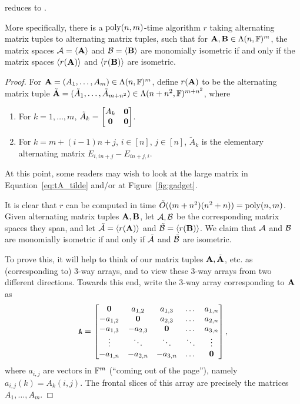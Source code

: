 \documentclass[11pt]{article}
\begin{document}
\begin{lemma} \label{lem:gadget}
\AltMatSpMonIsomlong reduces to \AltMatSpIsomWords. 

More specifically, there is a $\mathrm{poly}(n,m)$-time algorithm $r$ taking alternating matrix tuples to alternating matrix tuples, such that for $\mathbf{A}, \mathbf{B} \in \Lambda(n,\mathbb{F})^m$, the matrix spaces $\mathcal{A} = \langle \mathbf{A} \rangle$ and $\mathcal{B} = \langle \mathbf{B} \rangle$ are monomially isometric if and only if the matrix spaces $\langle r(\mathbf{A}) \rangle$ and $\langle r(\mathbf{B}) \rangle$ are isometric.
\end{lemma}

\begin{proof}
For $\mathbf{A} = (A_1, \dotsc, A_m) \in \Lambda(n,\mathbb{F})^m$, define $r(\mathbf{A})$ to be the alternating matrix tuple 
$\tilde{\mathbf{A}}=(\tilde A_1, \dots, \tilde A_{m+n^2})\in \Lambda(n + n^2, \mathbb{F})^{m+n^2}$, 
where
\begin{enumerate}
\item For $k=1, \dots, m$, $\tilde A_k=\begin{bmatrix}
A_k & \mathbf{0} \\
\mathbf{0} & \mathbf{0} \\
\end{bmatrix}$.
\item For $k=m+(i-1)n+j$, $i\in[n]$, $j\in[n]$, $\tilde A_k$ is the elementary 
alternating matrix $E_{i,in+j} - E_{in+j,i}$.
\end{enumerate}
At this point, some readers may wish to look at the large 
matrix in Equation~\ref{eq:tA_tilde} 
and/or at Figure~\ref{fig:gadget}.

It is clear that $r$ can be computed in time $\tilde O((m+n^2)(n^2 + n)) = \mathrm{poly}(n,m)$. Given alternating matrix tuples $\mathbf{A}, \mathbf{B}$, let $\mathcal{A},\mathcal{B}$ be the corresponding matrix spaces they span, and let $\tilde{\mathcal{A}} = \langle r(\mathbf{A}) \rangle$ and $\tilde{\mathcal{B}} = \langle r(\mathbf{B}) \rangle$. We claim that $\mathcal{A}$ and $\mathcal{B}$ are monomially isometric if and only if $\tilde{\mathcal{A}}$ and $\tilde{\mathcal{B}}$ are isometric.

To prove this, it will help to think of our matrix tuples $\mathbf{A}, \tilde {\mathbf{A}}$, etc. as (corresponding to) 3-way arrays, and to view these 3-way arrays from two different directions. Towards this end, write the 3-way array corresponding to $\mathbf{A}$ as
$$
\mathtt{A}=\begin{bmatrix}
\mathbf{0} & a_{1,2} & a_{1,3} & \dots & a_{1,n} \\
-a_{1,2} & \mathbf{0} & a_{2,3} & \dots & a_{2,n} \\
-a_{1,3} & -a_{2,3} & \mathbf{0} & \dots & a_{3,n}\\
\vdots & \ddots & \ddots & \ddots & \vdots \\
-a_{1,n} & -a_{2,n} & -a_{3,n} & \dots & \mathbf{0}
\end{bmatrix}, 
$$
where $a_{i,j}$ are vectors in $\mathbb{F}^m$ (``coming out of the page''), namely $a_{i,j}(k) = A_k(i,j)$. The frontal slices of this array are precisely the matrices $A_1, \dotsc, A_m$.


\end{proof}
\end{document}
